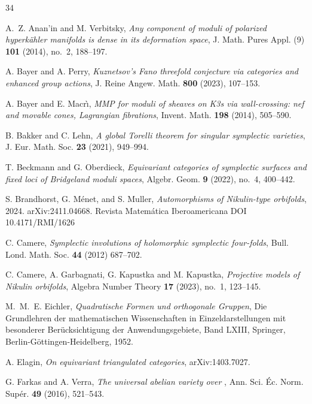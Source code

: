 \documentclass{amsart}
\makeatletter
\theoremstyle{definition}
\numberwithin{equation}{section}
\numberwithin{equation}{section} \theoremstyle{definition}
\newcounter{mathrecordid}
\newcommand{\mathboxbegin}[1]{%
  \stepcounter{mathrecordid}%
  \immediate\write\mathrecords{\themathrecordid,#1}%
  \special{pdf:bann << /Type /Annot /Subtype /Link /Border [0 0 0]
    /MathBoxID \themathrecordid /F 2
    /A << /S /URI /URI (urn:mathbox:\themathrecordid) >> >>}}
\newcommand{\mathboxinlineplain}[1]{$#1$}
\newcommand{\mathboxinline}[1]{%
  $\mathboxbegin{inline}#1\special{pdf:eann}$}
\newcommand{\recordmath}{%
  \ifmeasuring@\expandafter\mathboxinlineplain
  \else\expandafter\mathboxinline\fi}
\makeatother
\begin{document}
\begin{thebibliography}{34}

 A.~Z. Anan'in and M. Verbitsky,
  \emph{Any component of moduli of polarized hyperk\"ahler manifolds is dense
  in its deformation space}, J. Math. Pures Appl. (9) {\bf 101} (2014),
  no.~2, 188--197.

 A. Bayer and A. Perry,
  \emph{Kuznetsov's Fano threefold conjecture via \recordmath{K3} categories and enhanced
  group actions}, J. Reine Angew. Math. {\bf 800} (2023), 107--153.

 A. Bayer and E. Macr\`\i,
  \emph{MMP for moduli of sheaves on K3s via wall-crossing: nef and movable
  cones, Lagrangian fibrations}, Invent. Math. {\bf 198} (2014), 505--590.



 B. Bakker and C. Lehn,
  \emph{A global Torelli theorem for singular symplectic varieties},
  J. Eur. Math. Soc. {\bf 23} (2021), 949--994.

 T. Beckmann and G. Oberdieck,
  \emph{Equivariant categories of symplectic surfaces and fixed loci of
  Bridgeland moduli spaces}, Algebr. Geom. {\bf 9} (2022), no.~4, 400--442.

 S. Brandhorst, G. M\'enet, and S. Muller,
  \emph{Automorphisms of Nikulin-type orbifolds}, 2024. arXiv:2411.04668. Revista Matemática Iberoamericana DOI
10.4171/RMI/1626

 C. Camere, \emph{Symplectic involutions of holomorphic symplectic four-folds}, Bull. Lond. Math.
Soc. {\bf 44} (2012) 687--702.

 C. Camere, A. Garbagnati, G. Kapustka and M. Kapustka, 
  \emph{Projective models of Nikulin orbifolds}, Algebra Number Theory {\bf 17}
  (2023), no.~1, 123--145. %

 M.~M.~E. Eichler, {\it Quadratische Formen und orthogonale Gruppen}, Die Grundlehren der mathematischen Wissenschaften in Einzeldarstellungen mit besonderer Ber\"ucksichtigung der Anwendungsgebiete, Band LXIII, Springer, Berlin-G\"ottingen-Heidelberg, 1952.

 A. Elagin,
  \emph{On equivariant triangulated categories}, arXiv:1403.7027.

 G. Farkas and A. Verra,
  \emph{The universal abelian variety over \recordmath{\mathcal{A}_5}},
  Ann. Sci. \'Ec. Norm. Sup\'er. {\bf 49} (2016), 521--543.


\end{thebibliography}
\end{document}
